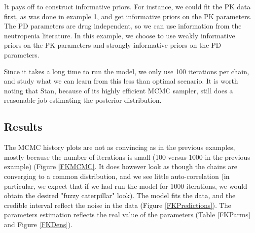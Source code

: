 \documentclass[11pt, reqno, oneside]{amsbook}
\numberwithin{equation}{chapter}
\numberwithin{figure}{chapter}
\numberwithin{table}{chapter}
\theoremstyle{remark}
\begin{document}
It pays off to construct informative priors. For instance, we could
fit the PK data first, as was done in  example 1, and get informative
priors on the PK parameters. The PD parameters are drug independent,
so we can use information from the neutropenia literature. In this
example, we choose to use weakly informative priors on the PK
parameters and strongly informative priors on the PD parameters. 

Since it takes a long time to run the model, we only use 100
iterations per chain, and study what we can learn from this less than
optimal scenario. It is worth noting that Stan, because of its highly
efficient MCMC sampler, still does a reasonable job estimating the
posterior distribution.

\subsection{Results}
\label{sec:org5133356}
The MCMC history plots are not as convincing
as in the previous examples, mostly because the number of iterations
is small (100 versus 1000 in the previous example) (Figure \ref{FKMCMC}. It does however look as though the chains are converging
to a common distribution, and we see little auto-correlation (in
particular, we expect that if we had run the model for 1000
iterations, we would obtain the desired "fuzzy caterpillar"
look). The model fits the data, and the credible interval reflect the
noise in the data (Figure \ref{FKPredictions}). The parameters
estimation reflects the real value of the parameters (Table \ref{FKParms} and Figure \ref{FKDens}).
\end{document}
